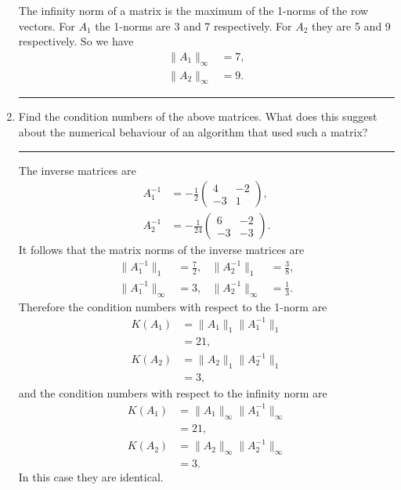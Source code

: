 \documentclass[10pt]{article}
\begin{document}
\begin{enumerate}
  The infinity norm of a matrix is the maximum of the 1-norms of the row
  vectors. For $A_1$ the 1-norms are 3 and 7 respectively. For $A_2$
  they are 5 and 9 respectively. So we have
  \begin{align*}
    \|A_1\|_{\infty} & = 7, \\
    \|A_2\|_{\infty} & = 9.
  \end{align*}
  \begin{center}
    \rule{0.9\textwidth}{.1pt}
  \end{center}  
\item Find the condition numbers of the above matrices. What does this
  suggest about the numerical behaviour of an algorithm that used such
  a matrix?
  \begin{center}
    \rule{0.9\textwidth}{.1pt}
  \end{center}  
  The inverse matrices are
  \begin{align*}
    A_1^{-1} & =
      -\frac{1}{2}
    \begin{pmatrix}
      4 & -2 \\ -3 & 1
    \end{pmatrix}, \\
    A_2^{-1} & =
      -\frac{1}{24}
    \begin{pmatrix}
      6 & -2 \\ -3 & -3
    \end{pmatrix}.
  \end{align*}
  It follows that the matrix norms of the inverse matrices are
  \begin{align*}
    \|A_1^{-1}\|_1 & = \frac{7}{2}, & \|A_2^{-1}\|_1 & = \frac{3}{8}, \\
    \|A_1^{-1}\|_{\infty} & = 3, & \|A_2^{-1}\|_{\infty} & = \frac{1}{3}.
  \end{align*}
  Therefore the condition numbers with respect to the 1-norm are
  \begin{align*}
    K(A_1) & = \|A_1\|_1 \|A_1^{-1}\|_1 \\
           & = 21, \\
    K(A_2) & = \|A_2\|_1 \|A_2^{-1}\|_1 \\
           & = 3,
  \end{align*}
  and the condition numbers with respect to the infinity norm are
  \begin{align*}
    K(A_1) & = \|A_1\|_{\infty} \|A_1^{-1}\|_{\infty} \\
           & = 21, \\
    K(A_2) & = \|A_2\|_{\infty} \|A_2^{-1}\|_{\infty} \\
           & = 3.
  \end{align*}
  In this case they are identical.


\end{enumerate}
\end{document}
